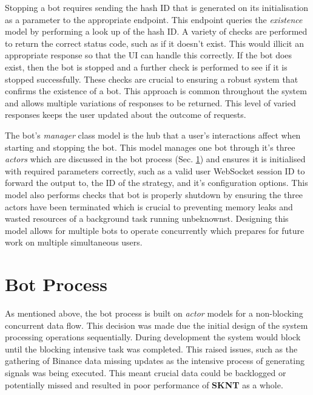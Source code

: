 Stopping a bot requires sending the hash ID that is generated on its initialisation as a parameter to the appropriate endpoint. This endpoint queries the \textit{existence} model by performing a look up of the hash ID. A variety of checks are performed to return the correct status code, such as if it doesn't exist.  This would illicit an appropriate response so that the UI can handle this correctly. If the bot does exist, then the bot is stopped and a further check is performed to see if it is stopped successfully. These checks are crucial to ensuring a robust system that confirms the existence of a bot. This approach is common throughout the system and allows multiple variations of responses to be returned. This level of varied responses keeps the user updated about the outcome of requests.

The bot's \textit{manager} class model is the hub that a user's interactions affect when starting and stopping the bot. This model manages one bot through it's three \textit{actors} which are discussed in the bot process (Sec. \ref{sec:implementation:bot}) and ensures it is initialised with required parameters correctly, such as a valid user WebSocket session ID to forward the output to, the ID of the strategy, and it's configuration options. This model also performs checks that bot is properly shutdown by ensuring the three actors have been terminated which is crucial to preventing memory leaks and wasted resources of a background task running unbeknownst. Designing this model allows for multiple bots to operate concurrently which prepares for future work on multiple simultaneous users.


\section{Bot Process}
\label{sec:implementation:bot}

\noindent As mentioned above, the bot process is built on \textit{actor} models for a non-blocking concurrent data flow. This decision was made due the initial design of the system processing operations sequentially. During development the system would block until the blocking intensive task was completed. This raised issues, such as the gathering of Binance data missing updates as the intensive process of generating signals was being executed. This meant crucial data could be backlogged or potentially missed and resulted in poor performance of \textbf{SKNT} as a whole.

